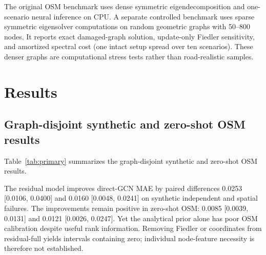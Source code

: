 \documentclass[11pt]{article}
\begin{document}
The original OSM benchmark uses dense symmetric eigendecomposition and
one-scenario neural inference on CPU. A separate controlled benchmark uses sparse symmetric eigensolver computations on random geometric graphs with 50--800 nodes. It
reports exact damaged-graph solution, update-only Fiedler sensitivity, and
amortized spectral cost (one intact setup spread over ten scenarios). These
denser graphs are computational stress tests rather than road-realistic samples.

\section{Results}
\subsection{Graph-disjoint synthetic and zero-shot OSM results}
Table~\ref{tab:primary} summarizes the graph-disjoint synthetic and zero-shot
OSM results.
\begin{table}[H]
\centering\small
\caption{MAE as seed mean [95\% seed-bootstrap interval].}
\label{tab:primary}
\end{table}

The residual model improves direct-GCN MAE by paired differences 0.0253
[0.0106, 0.0400] and 0.0160 [0.0048, 0.0241] on synthetic independent and
spatial failures. The improvements remain positive in zero-shot OSM: 0.0085
[0.0039, 0.0131] and 0.0121 [0.0026, 0.0247]. Yet the analytical prior alone
has poor OSM calibration despite useful rank information. Removing Fiedler or
coordinates from residual-full yields intervals containing zero; individual
node-feature necessity is therefore not established.
\end{document}
